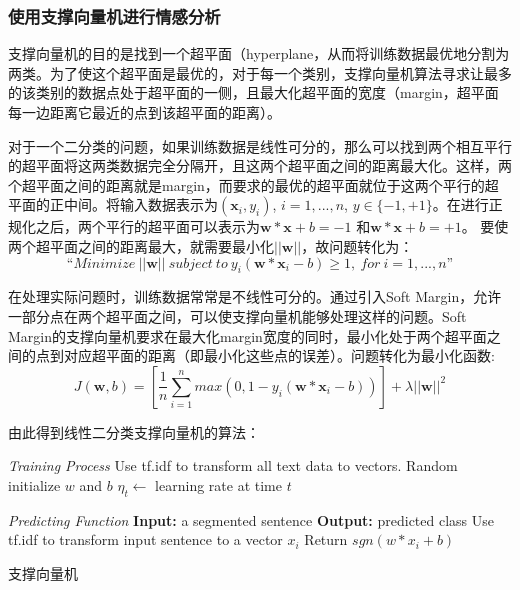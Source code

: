 \subsubsection{使用支撑向量机进行情感分析}
支撑向量机的目的是找到一个超平面（hyperplane，从而将训练数据最优地分割为两类。为了使这个超平面是最优的，对于每一个类别，支撑向量机算法寻求让最多的该类别的数据点处于超平面的一侧，且最大化超平面的宽度（margin，超平面每一边距离它最近的点到该超平面的距离）。

对于一个二分类的问题，如果训练数据是线性可分的，那么可以找到两个相互平行的超平面将这两类数据完全分隔开，且这两个超平面之间的距离最大化。这样，两个超平面之间的距离就是margin，而要求的最优的超平面就位于这两个平行的超平面的正中间。将输入数据表示为$(\textbf{x}_i, y_i)$, $i=1,..., n$, $y \in \{-1,+1\}$。在进行正规化之后，两个平行的超平面可以表示为$\textbf{w}*\textbf{x}+b=-1$ 和$\textbf{w}*\textbf{x}+b=+1$。 要使两个超平面之间的距离最大，就需要最小化$||\textbf{w}||$，故问题转化为：
\begin{equation} \label{eq2.2}
“Minimize\ ||\textbf{w}||\ subject\ to\ y_i(\textbf{w}*\textbf{x}_i-b)\ge 1,\ for\ i=1,...,n”
\end{equation}

在处理实际问题时，训练数据常常是不线性可分的。通过引入Soft Margin，允许一部分点在两个超平面之间，可以使支撑向量机能够处理这样的问题。Soft Margin的支撑向量机要求在最大化margin宽度的同时，最小化处于两个超平面之间的点到对应超平面的距离（即最小化这些点的误差）。问题转化为最小化函数:
\begin{equation} \label{eq2.3}
J(\textbf{w},b)=[\frac{1}{n}\sum_{i=1}^{n}max(0,1-y_i(\textbf{w}*\textbf{x}_i-b))]+\lambda ||\textbf{w}||^2
\end{equation}

由此得到线性二分类支撑向量机的算法：
\begin{algorithm}

\emph{Training Process}\;
Use tf.idf to transform all text data to vectors.\;
Random initialize $w$ and $b$\;
$\eta_t\leftarrow$ learning rate at time $t$\;

\BlankLine
\emph{Predicting Function}\;
\textbf{Input:} a segmented sentence\;
\textbf{Output:} predicted class\;
Use tf.idf to transform input sentence to a vector $x_{i}$\;
Return $sgn(w * x_i + b)$
\caption{支撑向量机}\label{SVM}
\label{alog:algorithm1}
\end{algorithm}\DecMargin{1em}


